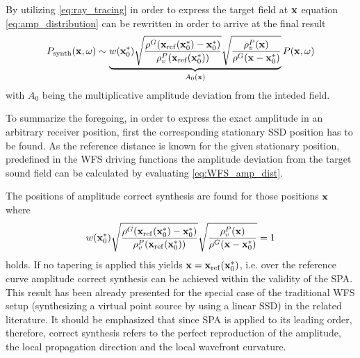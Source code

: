 \documentclass[lettersize,journal]{IEEEtran}
\begin{document}
By utilizing \eqref{eq:ray_tracing} in order to express the target field at $\mathbf{x}$ equation \eqref{eq:amp_distribution} can be rewritten in order to arrive at the final result
{\fontsize{8pt}{\baselineskip}
\selectfont
\begin{multline}
  P_{\mathrm{synth}}(\mathbf{x},\omega) \sim  \underbrace{w(\mathbf{x}_0^*)
  \sqrt{\frac{ \rho^G(\mathbf{x}_{\mathrm{ref}}(\mathbf{x}_0^*)-\mathbf{x}_0^*) }{ \rho^P_v(\mathbf{x}_{\mathrm{ref}}(\mathbf{x}_0^*))} }
  \sqrt{\frac{ \rho^P_v(\mathbf{x})}{ \rho^G(\mathbf{x}-\mathbf{x}_0^*) } }}_{A_0(\mathbf{x})}
   P(\mathbf{x},\omega)
   \label{eq:WFS_amp_dist} 
\end{multline}}
with $A_0$ being the multiplicative amplitude deviation from the inteded field.

To summarize the foregoing, in order to express the exact amplitude in an arbitrary receiver position, first the corresponding stationary SSD position has to be found.
As the reference distance is known for the given stationary position, predefined in the WFS driving functions the amplitude deviation from the target sound field can be calculated by evaluating \eqref{eq:WFS_amp_dist}.

The positions of amplitude correct synthesis are found for those positions $\mathbf{x}$ where 
\begin{equation}
w(\mathbf{x}_0^*)
\sqrt{\frac{ \rho^G(\mathbf{x}_{\mathrm{ref}}(\mathbf{x}_0^*)-\mathbf{x}_0^*) }{ \rho^P_v(\mathbf{x}_{\mathrm{ref}}(\mathbf{x}_0^*))} }
\sqrt{\frac{ \rho^P_v(\mathbf{x})}{ \rho^G(\mathbf{x}-\mathbf{x}_0^*) } } = 1
\label{eq:correct_positions}
\end{equation}
holds.
If no tapering is applied this yields $\mathbf{x} = \mathbf{x}_{\mathrm{ref}}(\mathbf{x}_0^*)$, i.e. over the reference curve amplitude correct synthesis can be achieved within the validity of the SPA.
This result has been already presented for the special case of the traditional WFS setup (synthesizing a virtual point source by using a linear SSD) in the related literature\cite{Verheijen1997:phd}.
It should be emphasized that since SPA is applied to its leading order, therefore, correct synthesis refers to the perfect reproduction of the amplitude, the local propagation direction and the local wavefront curvature.
\end{document}
